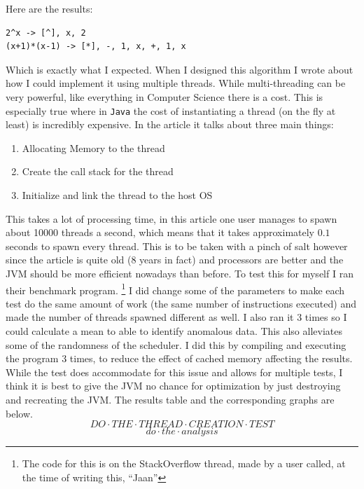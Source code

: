 \documentclass[../../../../../main.tex]{subfiles}
\begin{document}
Here are the results:
\begin{verbatim}
2^x -> [^], x, 2
(x+1)*(x-1) -> [*], -, 1, x, +, 1, x
\end{verbatim}
Which is exactly what I expected.
\newpage \noindent
When I designed this algorithm I wrote about how I could implement it using multiple threads. While multi-threading can be very powerful, like everything in Computer Science there is a cost. This is especially true where in \texttt{Java} the cost of instantiating a thread\cite{threadCreationJava} (on the fly at least) is incredibly expensive. In the article it talks about three main things:
\begin{enumerate}
\item Allocating Memory to the thread
\item Create the call stack for the thread\cite{threadStackJava, callStack}
\item Initialize and link the thread to the host OS
\end{enumerate}
This takes a lot of processing time, in this article\cite{threadCreationRate} one user manages to spawn about 10000 threads a second, which means that it takes approximately $0.1$ seconds to spawn every thread. This is to be taken with a pinch of salt however since the article is quite old (8 years in fact) and processors are better and the JVM should be more efficient nowadays than before. To test this for myself I ran their benchmark program.
\footnote{The code for this is on the StackOverflow thread, made by a user called, at the time of writing this, ``Jaan''\cite{threadCreationRate}} 
I did change some of the parameters to make each test do the same amount of work (the same number of instructions executed) and made the number of threads spawned different as well. I also ran it 3 times so I could calculate a mean to able to identify anomalous data. This also alleviates some of the randomness of the scheduler. I did this by compiling and executing the program 3 times, to reduce the effect of cached memory affecting the results. While the test does accommodate for this issue and allows for multiple tests, I think it is best to give the JVM no chance for optimization by just destroying and recreating the JVM. The results table and the corresponding graphs are below.
\[DO \cdot THE \cdot THREAD \cdot CREATION \cdot TEST\]
\[do \cdot the \cdot analysis\]
\end{document}
